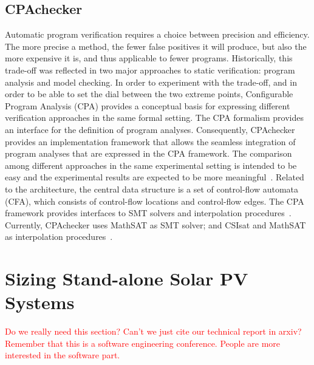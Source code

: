 \documentclass[10pt,conference]{IEEEtran}
\begin{document}
\subsection{CPAchecker}
Automatic program verification requires a choice between precision and efficiency. The
more precise a method, the fewer false positives it will produce, but also the more expensive it is, and thus applicable to fewer programs. Historically, this trade-off was
reflected in two major approaches to static verification: program analysis and model
checking. In order to experiment with the trade-off, and in order to be able to set the dial between the two extreme points, Configurable Program Analysis (CPA) provides a conceptual basis for expressing different verification approaches in the same formal setting. The CPA formalism provides an interface for the definition of program analyses. Consequently, CPAchecker provides an implementation framework that allows the seamless integration of program analyses that are expressed in the CPA framework. The comparison among different approaches in the same experimental setting is intended to be easy and the experimental results are expected to be more meaningful~\cite{Beyer2011}. Related to the architecture, the central data structure is a set of control-flow automata (CFA), which consists of control-flow locations and control-flow edges. The CPA framework provides interfaces to SMT solvers and interpolation procedures~\cite{Beyer2011}. Currently, CPAchecker uses MathSAT as SMT solver; and CSIsat and MathSAT as interpolation procedures~\cite{Beyer2011}. 

\section{Sizing Stand-alone Solar PV Systems}
\label{sec:sizing}

\textcolor{red}{Do we really need this section? Can't we just cite our technical report in arxiv? Remember that this is a software engineering conference. People are more interested in the software part.}
\end{document}
